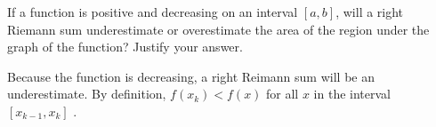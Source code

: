 \documentclass[handout, nooutcomes]{ximera}
\renewenvironment{freeResponse}{
\ifhandout\setbox0\vbox\bgroup\else
\begin{trivlist}\item[\hskip \labelsep\bfseries Solution:\hspace{2ex}]
\fi}
{\ifhandout\egroup\else
\end{trivlist}
\fi}
\begin{document}
\begin{problem}
  If a function is positive and decreasing on an interval $[a,b]$,  will a right Riemann sum underestimate or overestimate the area of the region under the graph of the function?
  Justify your answer.
\end{problem}
\begin{freeResponse}
  Because the function is decreasing, a right Reimann sum will be an underestimate.
  By definition, $f(x_k)< f(x)$ for all $x$ in the interval $[x_{k-1},x_k]$ .
\end{freeResponse}	
		
\end{document}
